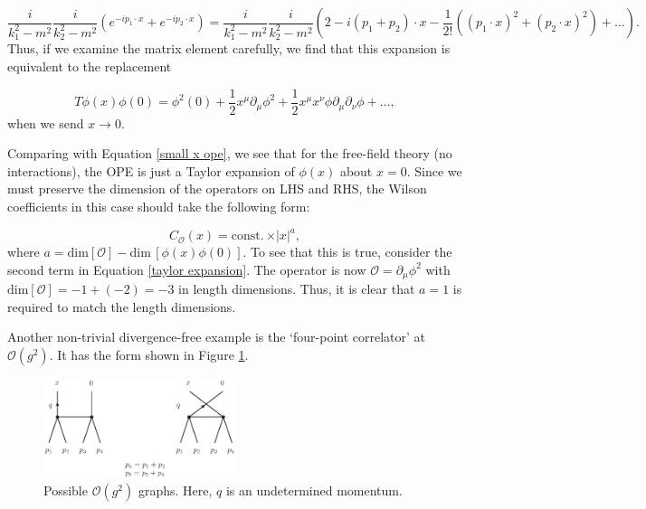 \documentclass{article}
\begin{document}
\begin{equation}
    \frac{i}{k_1^2-m^2}\frac{i}{k_2^2-m^2}(e^{-ip_1\cdot x}+e^{-ip_2\cdot x})=\frac{i}{k_1^2-m^2}\frac{i}{k_2^2-m^2}(2-i(p_1+p_2)\cdot x -\frac{1}{2!}\left( (p_1\cdot x)^2 + (p_2\cdot x)^2\right) + \dots ).
    \label{small x expansion}
\end{equation}
Thus, if we examine the matrix element carefully, we find that this expansion is equivalent to the replacement

\begin{equation}
    T\phi(x)\phi(0) = \phi^2(0) + \frac{1}{2}
x^\mu\partial_\mu\phi^2 + \frac{1}{2} x^\mu x^\nu\phi\partial_\mu\partial_\nu\phi + \dots,
\label{taylor expansion}
\end{equation}
when we send $x\rightarrow 0$.

Comparing with Equation \ref{small x ope}, we see that for the free-field theory (no interactions), the OPE is just a Taylor expansion of $\phi(x)$ about $x=0$. Since we must preserve the dimension of the operators on LHS and RHS, the Wilson coefficients in this case should take the following form:

\begin{equation}
    C_\mathcal{O}(x) = \mathrm{const.}\,\times\vert x\vert^a,
\end{equation}
where $a=\mathrm{dim}[\mathcal{O}]-\mathrm{dim}\,[\phi(x)\phi(0)]$. To see that this is true, consider the second term in Equation \ref{taylor expansion}. The operator is now $\mathcal{O}=\partial_\mu\phi^2$ with $\mathrm{dim}[\mathcal{O}]=-1+(-2)=-3$ in length dimensions. Thus, it is clear that $a=1$ is required to match the length dimensions.

Another non-trivial divergence-free example is the `four-point correlator' at $\mathcal{O}(g^2)$. It has the form shown in Figure \ref{fig:10.1.2}.

\begin{figure}[H]
\centering
\includegraphics[width=0.5\textwidth]{Graphs/Fig1012.eps}
\caption{Possible $\mathcal{O}(g^2)$ graphs. Here, $q$ is an undetermined momentum.}
\label{fig:10.1.2}
\end{figure}\\
\end{document}
